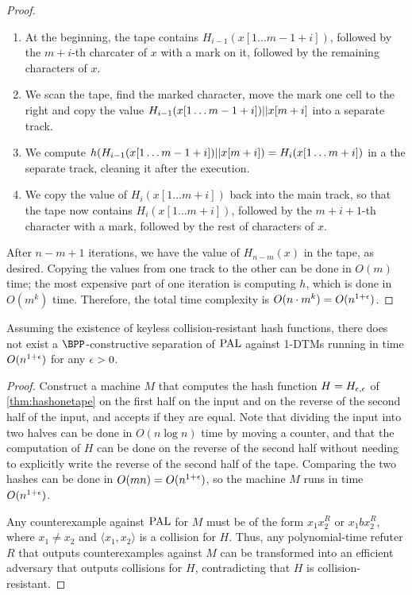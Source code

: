 \begin{proof}
\begin{enumerate}
    \item At the beginning, the tape contains $H_{i-1}(x[1 \ldots m-1+i])$, followed by the $m+i$-th 
    charcater of $x$ with a mark on it, followed by the remaining characters of $x$.
    \item We scan the tape, find the marked character, move the mark one cell to the right and copy the value 
    $H_{i-1}(x[1 \ldots m-1+i]) || x[m+i]$ into a separate track. 
    \item We compute $h(H_{i-1}(x[1 \ldots m-1+i]) || x[m+i]) = H_i(x[1 \ldots m+i])$ in a the separate
    track, cleaning it after the execution.
    \item We copy the value of $H_i(x[1 \ldots m+i])$ back into the main track, so that the tape now contains
    $H_{i}(x[1 \ldots m+i])$, followed by the $m+i+1$-th character with a mark, followed by the rest of characters
    of $x$.
\end{enumerate}

After $n-m+1$ iterations, we have the value of $H_{n-m}(x)$ in the tape, as desired. Copying the values from one
track to the other can be done in $O(m)$ time; the most expensive part of one iteration is computing $h$, which 
is done in $O(m^k)$ time. Therefore, the total time complexity is $O(n \cdot m^k) = O(n^{1+\epsilon})$. 



\end{proof}

\begin{theorem}
    \label{thm:nobppseparation}
    Assuming the existence of keyless collision-resistant hash functions, there does not exist a 
    $\BPP$-constructive separation of $\mathrm{PAL}$ against 1-DTMs running in time $O(n^{1+\epsilon})$ for any $\epsilon > 0$.
\end{theorem}

\begin{proof}
Construct a machine $M$ that computes the hash function $H = H_{\epsilon, \epsilon}$ of \cref{thm:hashonetape} on the first
half on the input and on the reverse of the second half of the input, and accepts if they are equal. Note that dividing the 
input into two halves can be done in $O(n \log n)$ time by moving a counter, 
and that the computation of $H$ can be done on the reverse of
the second half without needing to explicitly write the reverse of the second half of the tape. Comparing the 
two hashes can be done in $O(mn) = O(n^{1+\epsilon})$, so the machine $M$ runs in time $O(n^{1+\epsilon})$. 

Any counterexample against $\mathrm{PAL}$ for $M$ must be of the form $x_1 x_2^R$ or $x_1 b x_2^R$,
where $x_1 \neq x_2$ and $\langle x_1, x_2 \rangle$ is a collision for $H$.
Thus, any polynomial-time refuter $R$ that outputs counterexamples against $M$ can be transformed into an 
efficient adversary that outputs collisions for $H$, contradicting that $H$ is collision-resistant. 
\end{proof}

